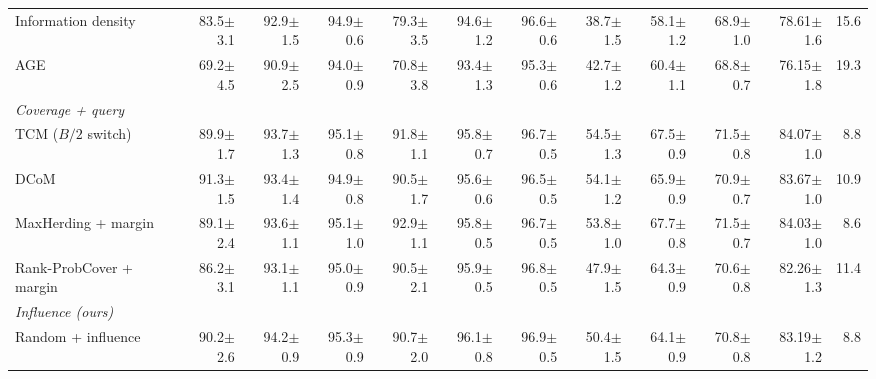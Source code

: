\begin{table}[t]
\begin{adjustbox}{max width=\textwidth}
\begin{tabular}{lrrrrrrrrrrr}
\quad Information density~\cite{settles2008analysis} & 83.5{\scriptsize$\pm$3.1} & 92.9{\scriptsize$\pm$1.5} & 94.9{\scriptsize$\pm$0.6} & 79.3{\scriptsize$\pm$3.5} & 94.6{\scriptsize$\pm$1.2} & 96.6{\scriptsize$\pm$0.6} & 38.7{\scriptsize$\pm$1.5} & 58.1{\scriptsize$\pm$1.2} & 68.9{\scriptsize$\pm$1.0} & 78.61{\scriptsize$\pm$1.6} & 15.6 \\
\quad AGE~\cite{cai2017active} & 69.2{\scriptsize$\pm$4.5} & 90.9{\scriptsize$\pm$2.5} & 94.0{\scriptsize$\pm$0.9} & 70.8{\scriptsize$\pm$3.8} & 93.4{\scriptsize$\pm$1.3} & 95.3{\scriptsize$\pm$0.6} & 42.7{\scriptsize$\pm$1.2} & 60.4{\scriptsize$\pm$1.1} & 68.8{\scriptsize$\pm$0.7} & 76.15{\scriptsize$\pm$1.8} & 19.3 \\
\multicolumn{12}{l}{\textit{Coverage + query}} \\
\quad TCM ($B/2$ switch)~\cite{doucet2024bridging} & 89.9{\scriptsize$\pm$1.7} & 93.7{\scriptsize$\pm$1.3} & 95.1{\scriptsize$\pm$0.8} & 91.8{\scriptsize$\pm$1.1} & 95.8{\scriptsize$\pm$0.7} & 96.7{\scriptsize$\pm$0.5} & 54.5{\scriptsize$\pm$1.3} & 67.5{\scriptsize$\pm$0.9} & 71.5{\scriptsize$\pm$0.8} & 84.07{\scriptsize$\pm$1.0} & 8.8 \\
\quad DCoM~\cite{mishal2024dcom} & 91.3{\scriptsize$\pm$1.5} & 93.4{\scriptsize$\pm$1.4} & 94.9{\scriptsize$\pm$0.8} & 90.5{\scriptsize$\pm$1.7} & 95.6{\scriptsize$\pm$0.6} & 96.5{\scriptsize$\pm$0.5} & 54.1{\scriptsize$\pm$1.2} & 65.9{\scriptsize$\pm$0.9} & 70.9{\scriptsize$\pm$0.7} & 83.67{\scriptsize$\pm$1.0} & 10.9 \\
\quad MaxHerding + margin & 89.1{\scriptsize$\pm$2.4} & 93.6{\scriptsize$\pm$1.1} & 95.1{\scriptsize$\pm$1.0} & 92.9{\scriptsize$\pm$1.1} & 95.8{\scriptsize$\pm$0.5} & 96.7{\scriptsize$\pm$0.5} & 53.8{\scriptsize$\pm$1.0} & 67.7{\scriptsize$\pm$0.8} & 71.5{\scriptsize$\pm$0.7} & 84.03{\scriptsize$\pm$1.0} & 8.6 \\
\quad Rank-ProbCover + margin & 86.2{\scriptsize$\pm$3.1} & 93.1{\scriptsize$\pm$1.1} & 95.0{\scriptsize$\pm$0.9} & 90.5{\scriptsize$\pm$2.1} & 95.9{\scriptsize$\pm$0.5} & 96.8{\scriptsize$\pm$0.5} & 47.9{\scriptsize$\pm$1.5} & 64.3{\scriptsize$\pm$0.9} & 70.6{\scriptsize$\pm$0.8} & 82.26{\scriptsize$\pm$1.3} & 11.4 \\
\multicolumn{12}{l}{\textit{Influence (ours)}} \\
\quad Random + influence & 90.2{\scriptsize$\pm$2.6} & 94.2{\scriptsize$\pm$0.9} & 95.3{\scriptsize$\pm$0.9} & 90.7{\scriptsize$\pm$2.0} & 96.1{\scriptsize$\pm$0.8} & 96.9{\scriptsize$\pm$0.5} & 50.4{\scriptsize$\pm$1.5} & 64.1{\scriptsize$\pm$0.9} & 70.8{\scriptsize$\pm$0.8} & 83.19{\scriptsize$\pm$1.2} & 8.8 \\

\end{tabular}
\end{adjustbox}
\end{table}

